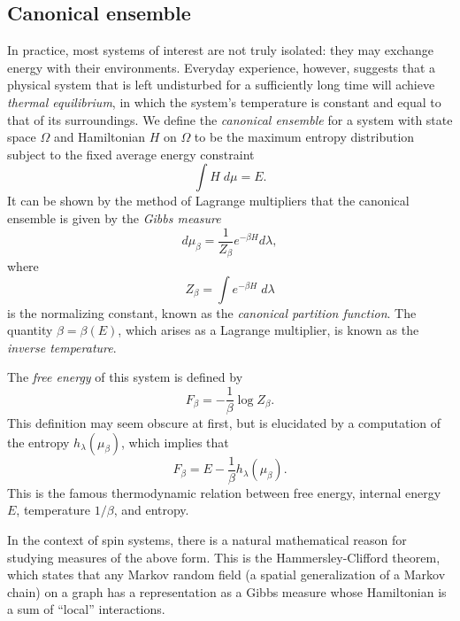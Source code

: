 
\subsection{Canonical ensemble}

In practice, most systems of interest are not truly isolated: they may exchange
energy with their environments. Everyday experience, however, suggests that
a physical system that is left undisturbed for a sufficiently long time will achieve
\emph{thermal equilibrium}, in which the system's temperature is constant and equal to
that of its surroundings. We define the \emph{canonical ensemble} for a system with
state space $\Omega$ and Hamiltonian $H$ on $\Omega$
to be the maximum entropy distribution subject to the fixed average energy constraint
\begin{equation}
\int H \; d\mu = E.
\end{equation}
It can be shown by the method of Lagrange multipliers that the canonical ensemble is
given by the \emph{Gibbs measure}
\begin{equation}
d\mu_\beta = \frac{1}{Z_\beta} e^{-\beta H} d\lambda,
\end{equation}
where
\begin{equation}
Z_\beta = \int e^{-\beta H} \; d\lambda
\end{equation}
is the normalizing constant, known as the \emph{canonical partition function}.
The quantity $\beta = \beta(E)$, which arises as a Lagrange multiplier, is known as
the \emph{inverse temperature}.

The \emph{free energy} of this system is defined by
\begin{equation}
F_\beta = -\frac{1}{\beta} \log Z_\beta.
\end{equation}
This definition may seem obscure at first, but is elucidated by
a computation of the entropy $h_\lambda(\mu_\beta)$, which implies that
\begin{equation}
F_\beta = E - \frac{1}{\beta} h_\lambda(\mu_\beta).
\end{equation}
This is the famous thermodynamic relation between free energy, internal energy $E$,
temperature $1/\beta$, and entropy.


In the context of spin systems, there is a natural mathematical reason for studying measures
of the above form. This is the Hammersley-Clifford theorem, which states that any Markov
random field (a spatial generalization of a Markov chain) on a graph has a representation
as a Gibbs measure whose Hamiltonian is a sum of ``local'' interactions.

